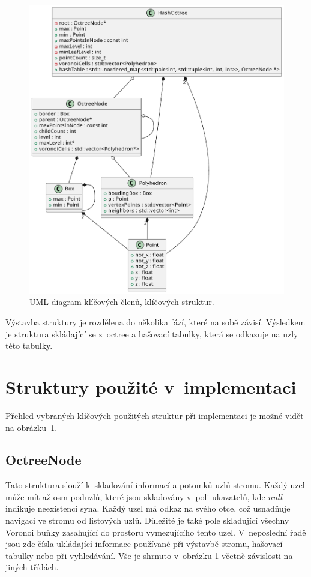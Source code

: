 \begin{figure}
    \centering
    \includegraphics[scale=0.8]{obrazky-figures/hashtree/uml.pdf}
    \caption{UML diagram klíčových členů, klíčových struktur.}
    \label{fig:uml}
\end{figure}

Výstavba struktury je rozdělena do několika fází, které na sobě závisí. Výsledkem je struktura skládající se z~octree a hašovací tabulky, která se odkazuje na uzly této tabulky.

\section{Struktury použité v~implementaci}
Přehled vybraných klíčových použitých struktur při implementaci je možné vidět na obrázku~\ref{fig:uml}.

\subsection*{OctreeNode}
Tato struktura slouží k~skladování informací a potomků uzlů stromu. Každý uzel může mít až osm poduzlů, které jsou skladovány v~poli ukazatelů, kde $null$ indikuje neexistenci syna. Každý uzel má odkaz na svého otce, což usnadňuje navigaci ve stromu od listových uzlů. Důležité je také pole skladující všechny Voronoi buňky zasahující do prostoru vymezujícího tento uzel. V~neposlední řadě jsou zde čísla ukládající informace používané při výstavbě stromu, hašovací tabulky nebo při vyhledávání. Vše je shrnuto v~obrázku \ref{fig:uml} včetně závislosti na jiných třídách.

